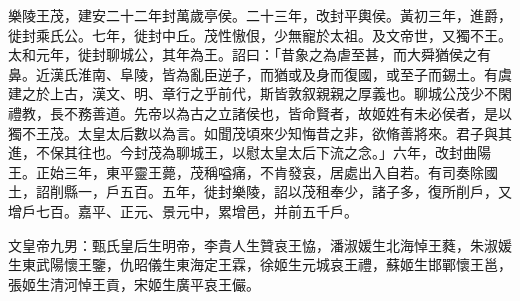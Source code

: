 \begin{pinyinscope}
 
 
 樂陵王茂，建安二十二年封萬歲亭侯。二十三年，改封平輿侯。黃初三年，進爵，徙封乘氏公。七年，徙封中丘。茂性慠佷，少無寵於太祖。及文帝世，又獨不王。太和元年，徙封聊城公，其年為王。詔曰：「昔象之為虐至甚，而大舜猶侯之有鼻。近漢氏淮南、阜陵，皆為亂臣逆子，而猶或及身而復國，或至子而錫土。有虞建之於上古，漢文、明、章行之乎前代，斯皆敦叙親親之厚義也。聊城公茂少不閑禮教，長不務善道。先帝以為古之立諸侯也，皆命賢者，故姬姓有未必侯者，是以獨不王茂。太皇太后數以為言。如聞茂頃來少知悔昔之非，欲脩善將來。君子與其進，不保其往也。今封茂為聊城王，以慰太皇太后下流之念。」六年，改封曲陽王。正始三年，東平靈王薨，茂稱嗌痛，不肯發哀，居處出入自若。有司奏除國土，詔削縣一，戶五百。五年，徙封樂陵，詔以茂租奉少，諸子多，復所削戶，又增戶七百。嘉平、正元、景元中，累增邑，并前五千戶。
 
 
 
 
 文皇帝九男：甄氏皇后生明帝，李貴人生贊哀王恊，潘淑媛生北海悼王蕤，朱淑媛生東武陽懷王鑒，仇昭儀生東海定王霖，徐姬生元城哀王禮，蘇姬生邯鄲懷王邕，張姬生清河悼王貢，宋姬生廣平哀王儼。
 
 
\end{pinyinscope}